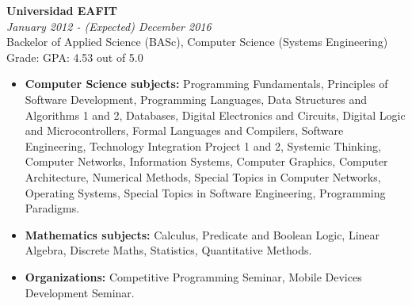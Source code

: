 \documentclass[margin, 10pt]{res} %
\begin{document}
\begin{resume}
\textbf{Universidad EAFIT} \\
\textit{January 2012 - (Expected) December 2016} \\
Backelor of Applied Science (BASc), Computer Science (Systems Engineering) \\
Grade: GPA: 4.53 out of 5.0
\begin{itemize}
  \item \textbf{Computer Science subjects:} Programming Fundamentals, Principles of Software
                Development, Programming Languages, Data Structures and Algorithms 1 and 2,
                Databases, Digital Electronics and Circuits, Digital Logic and Microcontrollers,
                Formal Languages and Compilers, Software Engineering,
                Technology Integration Project 1 and 2, Systemic Thinking, Computer Networks,
                Information Systems, Computer Graphics, Computer Architecture, Numerical Methods,
                Special Topics in Computer Networks, Operating Systems, Special Topics in Software
                Engineering, Programming Paradigms.
  \item \textbf{Mathematics subjects:} Calculus, Predicate and Boolean Logic, Linear Algebra,
                                       Discrete Maths, Statistics, Quantitative Methods.
  \item \textbf{Organizations:} Competitive Programming Seminar, Mobile Devices Development Seminar.
\end{itemize}



\end{resume}
\end{document}
